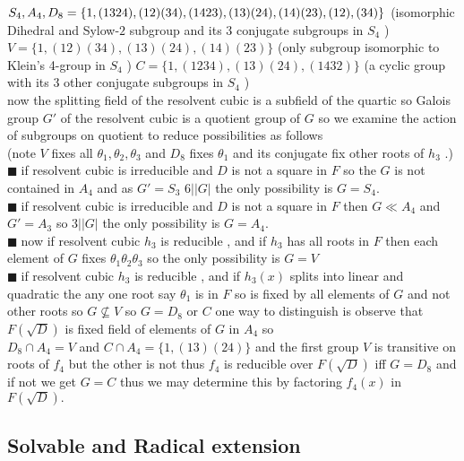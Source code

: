 \documentclass[11pt]{extarticle}
\newcommand{\y}{$\blacksquare\;$}
\begin{document}
\begin{multicols}{2}
{$ S_4,A_4,\\
D_8=\{1, (1324), (12) (34) , (1423), (13)(24) \\
, (14) (23), (12), (34) \} $ (isomorphic Dihedral and Sylow-$ 2 $ subgroup and its 3 conjugate subgroups in  $ S_4 $ )\\
$ V=\{1,( 1 2) (34) , (13) (24) , (14) (23)\} $ (only subgroup isomorphic to Klein's 4-group in $ S_4 $  )
$ C=\{ 1 , ( 1234), ( 13)(24), (1432)\} $ (a cyclic group with its 3 other conjugate subgroups in $ S_4 $ )\\
now the splitting field of the resolvent cubic is a subfield of the quartic so Galois group $ G' $ of the resolvent cubic is a quotient group of $ G $ so we examine the action of subgroups on quotient to reduce possibilities as follows \\
(note $ V $ fixes all $ \theta_1,\theta_2,\theta_3  $ and $  D_8 $ fixes $ \theta_1 $ and its conjugate fix other roots of $ h_3 $ .)\\
 \y if resolvent cubic is irreducible and $ D $ is not a square in $ F $ so the $ G $ is not contained in $ A_4 $ and as $ G'=S_3 $ $ 6||G|$  the only possibility is $ G=S_4. $ \\
 \y if resolvent cubic is irreducible and $ D $ is not a square in $ F $ then $ G\ll A_4 $ and $ G'=A_3 $ so $ 3||G| $ the only possibility is $ G=A_4. $ \\
 \y now if resolvent cubic $ h_3 $ is reducible , and if $ h_3 $ has all roots in $ F $ then each element of $ G $ fixes 
 $ \theta_1\theta_2\theta_3 $ so the only possibility is $ G=V $ \\
 \y if resolvent cubic $ h_3 $ is reducible , and if  $ h_3(x) $ splits into linear and quadratic the any one root say $ \theta_1 $ is in $ F $ so is fixed by all elements of $ G $ and not other roots so $ G\not\subseteq V $ so $ G=D_8 $ or $ C $ one way to distinguish is observe that $ F(\sqrt{D}) $ is fixed field of elements of $ G $ in $ A_4 $ so \\
 $ D_8\cap A_4=V $ and $ C\cap A_4=\{1,(13)(24)\} $  and the first group $ V $ is transitive on roots of $ f_4 $ but the other is not thus $ f_4 $ is reducible over $ F(\sqrt{D}) $ iff $ G=D_8 $ and if not we get $ G=C $ thus we may determine this by factoring $ f_4(x) $ in $ F(\sqrt{D}) .$}
 
 
   \subsection{Solvable and Radical extension}
   

\end{multicols}
\end{document}
